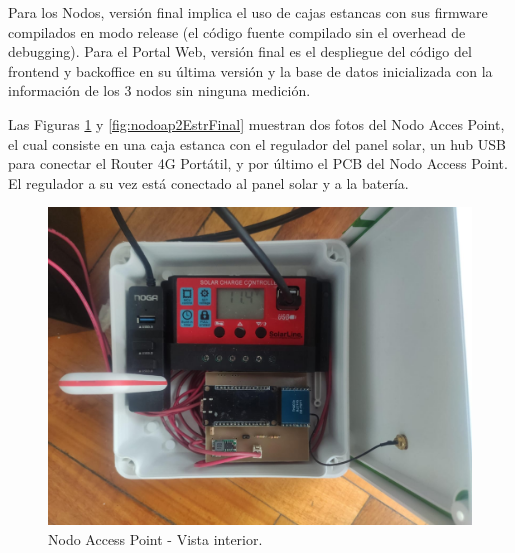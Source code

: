 Para los Nodos, versión final implica el uso de cajas estancas con sus firmware compilados en modo release (el código fuente compilado sin el overhead de debugging).
Para el Portal Web, versión final es el despliegue del código del frontend y backoffice en su última versión y la base de datos inicializada con la información de los 3 nodos sin ninguna medición.

Las Figuras \ref{fig:nodoap1EstrFinal} y \ref{fig:nodoap2EstrFinal} muestran dos fotos del Nodo Acces Point, el cual consiste en una caja estanca con el regulador del panel solar, un hub USB para conectar el Router 4G Portátil, y por último el PCB del Nodo Access Point. El regulador a su vez está conectado al panel solar y a la batería.

\begin{figure}[H]
	\centering
	\includegraphics[scale=0.20]{Figures/Pruebas/nodoap1.jpeg}
	\caption{Nodo Access Point - Vista interior.}
	\label{fig:nodoap1EstrFinal}
\end{figure}

